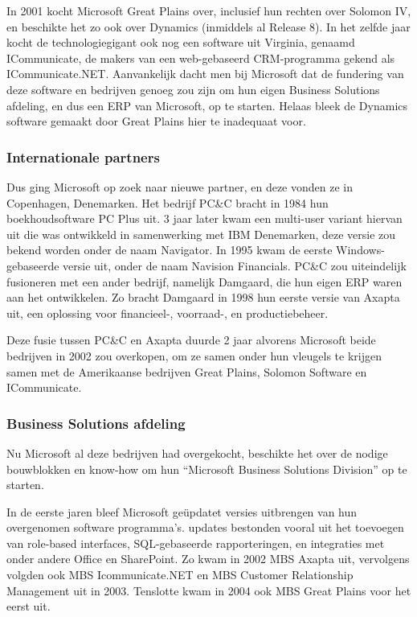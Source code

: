 In 2001 kocht Microsoft Great Plains over, inclusief hun rechten over Solomon IV, en beschikte het zo ook over Dynamics (inmiddels al Release 8). In het zelfde jaar kocht de technologiegigant ook nog een software uit Virginia, genaamd ICommunicate, de makers van een web-gebaseerd CRM-programma gekend als ICommunicate.NET. Aanvankelijk dacht men bij Microsoft dat de fundering van deze software en bedrijven genoeg zou zijn om hun eigen Business Solutions afdeling, en dus een ERP van Microsoft, op te starten. Helaas bleek de Dynamics software gemaakt door Great Plains hier te inadequaat voor. 

\subsubsection{Internationale partners }
Dus ging Microsoft op zoek naar nieuwe partner, en deze vonden ze in Copenhagen, Denemarken. Het bedrijf PC\&C bracht in 1984 hun boekhoudsoftware PC Plus uit. 3 jaar later kwam een multi-user variant hiervan uit die was ontwikkeld in samenwerking met IBM Denemarken, deze versie zou bekend worden onder de naam Navigator. In 1995 kwam de eerste Windows-gebaseerde versie uit, onder de naam Navision Financials. PC\&C zou uiteindelijk fusioneren met een ander bedrijf, namelijk Damgaard, die hun eigen ERP waren aan het ontwikkelen. Zo bracht Damgaard in 1998 hun eerste versie van Axapta uit, een oplossing voor financieel-, voorraad-, en productiebeheer.
 
Deze fusie tussen PC\&C en Axapta duurde 2 jaar alvorens Microsoft beide bedrijven in 2002 zou overkopen, om ze samen onder hun vleugels te krijgen samen met de Amerikaanse bedrijven Great Plains,  Solomon Software en ICommunicate. 

\subsubsection{Business Solutions afdeling}
Nu Microsoft al deze bedrijven had overgekocht, beschikte het over de nodige bouwblokken en know-how om hun “Microsoft Business Solutions Division” op te starten. 

In de eerste jaren bleef Microsoft geüpdatet versies uitbrengen van hun overgenomen software programma’s. updates bestonden vooral uit het toevoegen van role-based interfaces, SQL-gebaseerde rapporteringen, en integraties met onder andere Office en SharePoint.  Zo kwam in 2002 MBS Axapta uit, vervolgens volgden ook MBS Icommunicate.NET en MBS Customer Relationship Management uit in 2003. Tenslotte kwam in 2004 ook MBS Great Plains voor het eerst uit. 

